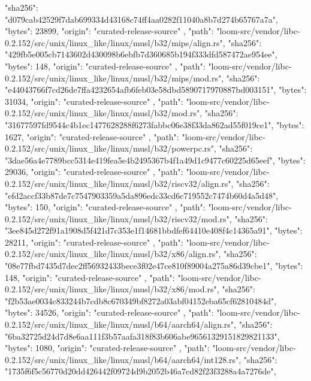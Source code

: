 {{      "sha256": "d079cab42529f7dab699334d43168c74ff4aa0282f11040a8b7d274b65767a7a",
      "bytes": 23899,
      "origin": "curated-release-source"
    },
    {
      "path": "loom-src/vendor/libc-0.2.152/src/unix/linux_like/linux/musl/b32/mips/align.rs",
      "sha256": "429fb5e005cb7143602d430098b6ebfb7d360685b194f333dfd587472ae954ee",
      "bytes": 148,
      "origin": "curated-release-source"
    },
    {
      "path": "loom-src/vendor/libc-0.2.152/src/unix/linux_like/linux/musl/b32/mips/mod.rs",
      "sha256": "e44043766f7cd26de7ffa4232654afb6feb03e58dbd5890717970887bd003151",
      "bytes": 31034,
      "origin": "curated-release-source"
    },
    {
      "path": "loom-src/vendor/libc-0.2.152/src/unix/linux_like/linux/musl/b32/mod.rs",
      "sha256": "31677597fd9544c4b1ec1477628288f6273fabbc06e38f33da862ad55f019ce1",
      "bytes": 1627,
      "origin": "curated-release-source"
    },
    {
      "path": "loom-src/vendor/libc-0.2.152/src/unix/linux_like/linux/musl/b32/powerpc.rs",
      "sha256": "3dae56a4e7789bcc5314e419fea5e4b2495367b4f1a49d1c9477c60225d65eef",
      "bytes": 29036,
      "origin": "curated-release-source"
    },
    {
      "path": "loom-src/vendor/libc-0.2.152/src/unix/linux_like/linux/musl/b32/riscv32/align.rs",
      "sha256": "efd2accf33b87de7c7547903359a5da896edc33cd6c719552c7474b60d4a5d48",
      "bytes": 150,
      "origin": "curated-release-source"
    },
    {
      "path": "loom-src/vendor/libc-0.2.152/src/unix/linux_like/linux/musl/b32/riscv32/mod.rs",
      "sha256": "3ee845d272f91a1908d5f421d7c353e1f14681bbdfef64410e408f4c14365a91",
      "bytes": 28211,
      "origin": "curated-release-source"
    },
    {
      "path": "loom-src/vendor/libc-0.2.152/src/unix/linux_like/linux/musl/b32/x86/align.rs",
      "sha256": "08e77fbd7435d7dec2ff56932433bece3f02e47ce810f89004a275a86d39cbe1",
      "bytes": 148,
      "origin": "curated-release-source"
    },
    {
      "path": "loom-src/vendor/libc-0.2.152/src/unix/linux_like/linux/musl/b32/x86/mod.rs",
      "sha256": "f2b53ae0034c833244b7cdb8c670349bf8272a03abf04152eba65cf62810484d",
      "bytes": 34526,
      "origin": "curated-release-source"
    },
    {
      "path": "loom-src/vendor/libc-0.2.152/src/unix/linux_like/linux/musl/b64/aarch64/align.rs",
      "sha256": "6ba32725d24d7d8e6aa111f3b57aafa318f83b606abe96561329151829821133",
      "bytes": 1080,
      "origin": "curated-release-source"
    },
    {
      "path": "loom-src/vendor/libc-0.2.152/src/unix/linux_like/linux/musl/b64/aarch64/int128.rs",
      "sha256": "1735f6f5c56770d20dd426442f09724d9b2052b46a7cd82f23f3288a4a7276de",
}}
